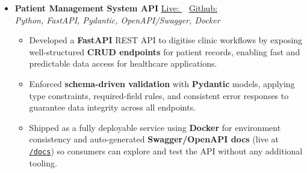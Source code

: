 \begin{itemize}
\item \textbf{Patient Management System API}
\href{https://patient-managment-system-api.vercel.app/docs}{Live: \faExternalLink} ~
\href{https://github.com/Ank0it/patient-managment-system-API}{Github: \faGithub} \\
\textit{Python, FastAPI, Pydantic, OpenAPI/Swagger, Docker}
\begin{itemize}
    \item Developed a \textbf{FastAPI} REST API to digitise clinic workflows by exposing well-structured
          \textbf{CRUD endpoints} for patient records, enabling fast and predictable data access for
          healthcare applications.
    \item Enforced \textbf{schema-driven validation} with \textbf{Pydantic} models, applying type constraints,
          required-field rules, and consistent error responses to guarantee data integrity across all
          endpoints.
    \item Shipped as a fully deployable service using \textbf{Docker} for environment consistency and
          auto-generated \textbf{Swagger/OpenAPI docs} (live at \href{https://patient-managment-system-api.vercel.app/docs}{\texttt{/docs}}) so consumers can explore and test
          the API without any additional tooling.
\end{itemize}

\end{itemize}
